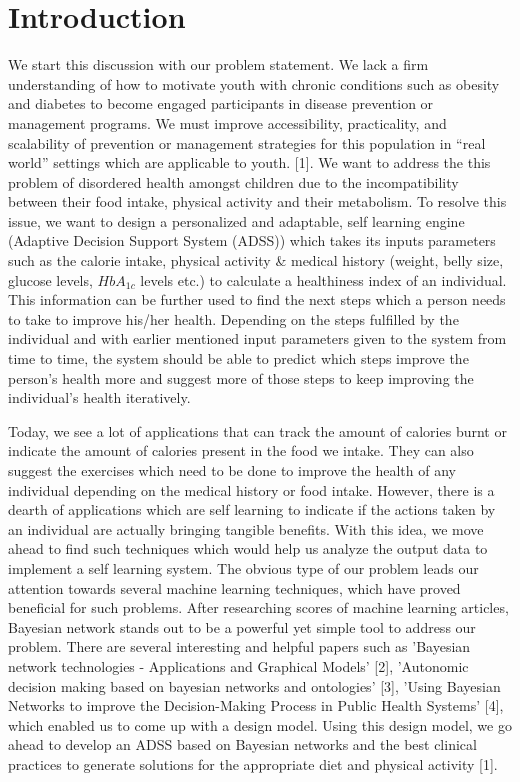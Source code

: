 \documentclass[10pt, conference, compsocconf]{IEEEtran}
\begin{document}
\section{Introduction}
We start this discussion with our problem statement. We lack a firm understanding of how to motivate youth with chronic conditions such as obesity and diabetes to become engaged participants in disease prevention or management programs. We must improve accessibility, practicality, and scalability of prevention or management strategies for this population in “real world” settings which are applicable to youth. [1]. We want to address the this problem of disordered health amongst children due to the incompatibility between their food intake, physical activity and their metabolism. To resolve this issue, we want to design a personalized and adaptable, self learning engine (Adaptive Decision Support System (ADSS)) which takes its inputs parameters such as the calorie intake, physical activity \& medical history (weight, belly size, glucose levels, $HbA_{1c}$ levels etc.) to calculate a healthiness index of an individual. This information can be further used to find the next steps which a person needs to take to improve his/her health. Depending on the steps fulfilled by the individual and with earlier mentioned input parameters given to the system from time to time, the system should be able to predict which steps improve the person's health more and suggest more of those steps to keep improving the individual's health iteratively.

Today, we see a lot of applications that can track the amount of calories burnt or indicate the amount of calories present in the food we intake. They can also suggest the exercises which need to be done to improve the health of any individual depending on the medical history or food intake. However, there is a dearth of applications which are self learning to indicate if the actions taken by an individual are actually bringing tangible benefits. With this idea, we move ahead to find such techniques which would help us analyze the output data to implement a self learning system. The obvious type of our problem leads our attention towards several machine learning techniques, which have proved beneficial for such problems. After researching scores of machine learning articles, Bayesian network stands out to be a powerful yet simple tool to address our problem. There are several interesting and helpful papers such as 'Bayesian network technologies - Applications and Graphical Models' [2], 'Autonomic decision making based on bayesian networks and ontologies' [3], 'Using Bayesian Networks to improve the Decision-Making Process in Public Health Systems' [4], which enabled us to come up with a design model. Using this design model, we go ahead to develop an ADSS based on Bayesian networks and the best clinical practices to generate solutions for the appropriate diet and physical activity [1].
\end{document}

